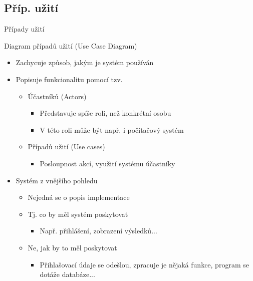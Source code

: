 \subsection{Příp. užití}



\begin{frame}{Případy užití}

Diagram případů užití (Use Case Diagram)

\begin{itemize}
	\item Zachycuje způsob, jakým je systém používán
	\item Popisuje funkcionalitu pomocí tzv.
	\begin{itemize}
		\item Účastníků (Actors)
		\begin{itemize}
			\item Představuje spíše roli, než konkrétní osobu
			\item V této roli může být např. i počítačový systém
		\end{itemize}
		\item Případů užití (Use cases)
		\begin{itemize}
			\item Posloupnost akcí, využití systému účastníky
		\end{itemize}
	\end{itemize}
	\item Systém z vnějšího pohledu
	\begin{itemize}
		\item Nejedná se o popis implementace
		\item Tj. co by měl systém poskytovat
		\begin{itemize}
			\item Např. přihlášení, zobrazení výsledků...
		\end{itemize}
		\item Ne, jak by to měl poskytovat
		\begin{itemize}
			\item Přihlašovací údaje se odešlou, zpracuje je nějaká funkce,
			program se dotáže databáze...
		\end{itemize}
	\end{itemize}
\end{itemize}


\end{frame}

